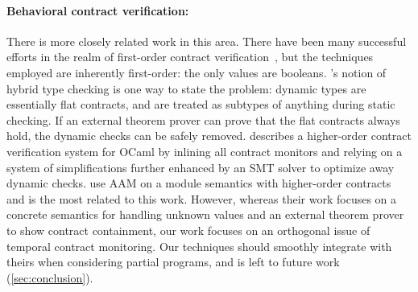 \paragraph{Behavioral contract verification:}
There is more closely related work in this area.
%
There have been many successful efforts in the realm of first-order contract verification~\citep{ianjohnson:fahndrich:contracts:2011,ianjohnson:vcc:2009}, but the techniques employed are inherently first-order: the only values are booleans.
%
\citet{ianjohnson:Flanagan:2006:HTC:1111037.1111059}'s notion of hybrid type checking is one way to state the problem: dynamic types are essentially flat contracts, and are treated as subtypes of anything during static checking.
%
If an external theorem prover can prove that the flat contracts always hold, the dynamic checks can be safely removed.
%
\citet{dvanhorn:Xu2012Hybrid} describes a higher-order contract verification system for OCaml by inlining all contract monitors and relying on a system of simplifications further enhanced by an SMT solver to optimize away dynamic checks.
%
\citet{dvanhorn:TobinHochstadt2012Higherorder} use AAM on a module semantics with higher-order contracts and is the most related to this work.
%
However, whereas their work focuses on a concrete semantics for handling unknown values and an external theorem prover to show contract containment, our work focuses on an orthogonal issue of temporal contract monitoring.
%
Our techniques should smoothly integrate with theirs when considering partial programs, and is left to future work (\cref{sec:conclusion}).
